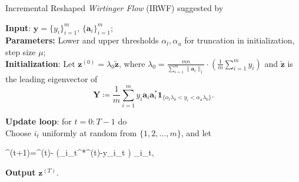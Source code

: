 	\begin{algorithm}[th] 
		\caption{Incremental Reshaped \emph{Wirtinger Flow} (IRWF) suggested by \cite{reshaped_and_incrementally_reshaped_wirtinger_flow}}\label{alg:irwf}
		\textbf{Input}: $\boldsymbol{y}=\{y_i\}_{i=1}^m$, $\{\boldsymbol{a}_i\}_{i=1}^m$; \\
		\textbf{Parameters:}  Lower and upper thresholds $\alpha_l,\alpha_u$ for  truncation in initialization, step size $\mu$;\\
		\textbf{Initialization}: Let $\boldsymbol{z}^{(0)}=\lambda_0 \tilde{\boldsymbol{z}}$, where $\lambda_0=\frac{mn}{\sum_{i=1}^m \|\boldsymbol{a}_i\|_1}\cdot \left(\frac{1}{m}\sum_{i=1}^m y_i\right)$ and $\tilde{\boldsymbol{z}}$ is the leading eigenvector of
		\begin{equation}
			\boldsymbol{Y} \coloneqq \frac{1}{m}\sum_{i=1}^m y_i\boldsymbol{a}_i \boldsymbol{a}_i^*\boldsymbol{1}_{\{\alpha_l \lambda_0<y_i< \alpha_u \lambda_0\}}.
		\end{equation}
		
		 \textbf{Update loop}: for $t=0:T-1$ do\\
		 Choose $i_t$ uniformly at random from $\{1,2,\ldots, m\}$, and let
		  \begin{flalign}
				\boldsymbol{z}^{(t+1)}=^{(t)}- \mu\left(_{i_t}^*^{(t)}-y_{i_t}\cdot{} \right) _{i_t}, \label{eq:incrementalupdate}
		\end{flalign}
		\textbf{Output} $\boldsymbol{z}^{(T)}$.
		\end{algorithm}



